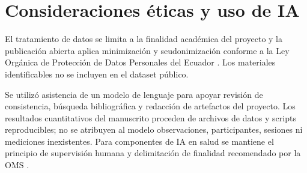 \documentclass[runningheads]{llncs}
\begin{document}
	\section{Consideraciones éticas y uso de IA}
	El tratamiento de datos se limita a la finalidad académica del proyecto y la publicación abierta aplica minimización y seudonimización conforme a la Ley Orgánica de Protección de Datos Personales del Ecuador \cite{loppd}. Los materiales identificables no se incluyen en el dataset público.
	
	Se utilizó asistencia de un modelo de lenguaje para apoyar revisión de consistencia, búsqueda bibliográfica y redacción de artefactos del proyecto. Los resultados cuantitativos del manuscrito proceden de archivos de datos y scripts reproducibles; no se atribuyen al modelo observaciones, participantes, sesiones ni mediciones inexistentes. Para componentes de IA en salud se mantiene el principio de supervisión humana y delimitación de finalidad recomendado por la OMS \cite{whoai2021}.
	
	
	
	
	
\end{document}
